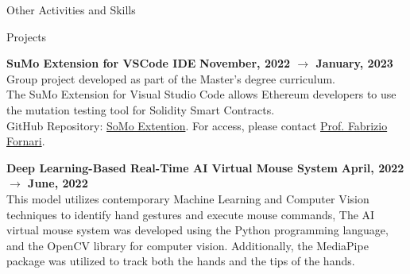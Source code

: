 \documentclass{resume} %
\begin{document}
    \begin{rSection}{Other Activities and Skills}


        \begin{rSubsection2}{ Projects }

            \item\textbf{ SuMo Extension for VSCode IDE }\hfill \textbf{November, 2022 $\rightarrow$ January, 2023}
            \\Group project developed as part of the Master's degree curriculum.
            \\The SuMo Extension for Visual Studio Code allows Ethereum developers to use the mutation testing tool for Solidity Smart Contracts.
            \\GitHub Repository: \href{https://github.com/FabrizioFornari/SPM-2022-AAR}{SoMo Extention}. For access, please contact \href{https://github.com/FabrizioFornari}{Prof. Fabrizio Fornari}.

            \item\textbf{ Deep Learning-Based Real-Time AI Virtual Mouse System }\hfill \textbf{April, 2022 $\rightarrow$ June, 2022}
            \\This model utilizes contemporary Machine Learning and Computer Vision techniques to identify hand gestures and execute mouse commands,
            The AI virtual mouse system was developed using the Python programming language, and the OpenCV library for computer vision.
            Additionally, the MediaPipe package was utilized to track both the hands and the tips of the hands.

        \end{rSubsection2}


\end{rSection}
\end{document}
